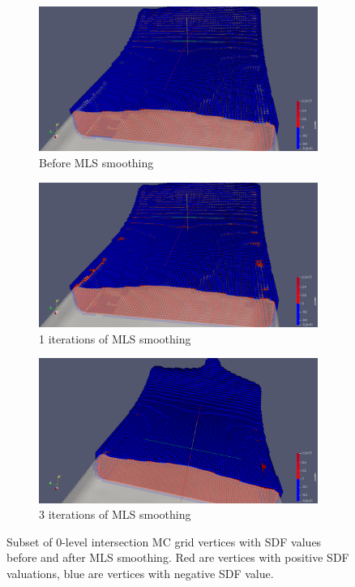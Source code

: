\begin{figure}
	\begin{center}
		\begin{subfigure}[b]{0.9\textwidth}
			\includegraphics[width=\textwidth]{figures/IntersectionCellsSdfBeforeMls_1_iter.png}	
			\caption{Before MLS smoothing} \label{fig:mls_0_iter}
		\end{subfigure}
		\begin{subfigure}[b]{0.9\textwidth}
			\includegraphics[width=\textwidth]{ figures/IntersectionCellsSdfAfterMls_1_iter.png}	
			\caption{1 iterations of MLS smoothing} \label{fig:mls_1_iter}
		\end{subfigure}
		\begin{subfigure}[b]{0.9\textwidth}
			\includegraphics[width=\textwidth]{figures/IntersectionCellsSdfAfterMls_3_iter.png}	
			\caption{3 iterations of MLS smoothing} \label{fig:mls_3_iter}
		\end{subfigure}
	\end{center}
	\caption{Subset of 0-level intersection MC grid vertices with SDF values before and after MLS smoothing. Red are vertices with positive SDF valuations, blue are vertices with negative SDF value.} 
	\label{fig:mls_iterations}
\end{figure}
